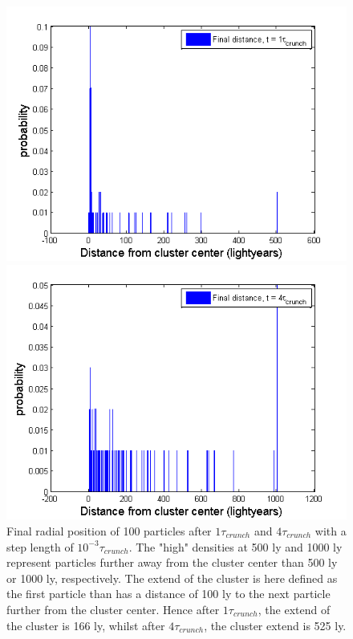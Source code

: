 \begin{figure}[H]
\centering
\begin{minipage}{.5\textwidth}
  \centering
  \includegraphics[width=1\linewidth]{Figures/stability/RK4_stability_1t.png}
\end{minipage}%
\begin{minipage}{.5\textwidth}
  \centering
  \includegraphics[width=1\linewidth]{Figures/stability/RK4_stability_4t_2_zoom.png}
\end{minipage}
\caption{
Final radial position of 100 particles after $1\tau_{crunch}$ and $4\tau_{crunch}$ with a step length of $10^{-3} \tau_{crunch}$.
The "high" densities at 500 ly and 1000 ly represent particles further away from the cluster center than 500 ly or 1000 ly, respectively.
The extend of the cluster is here defined as the first particle than has a distance of 100 ly to the next particle further from the cluster center. 
Hence after $1\tau_{crunch}$, the extend of the cluster is 166 ly, whilst after $4\tau_{crunch}$, the cluster extend is 525 ly.
}
\label{fig:StabilityEquilibriumHistogram}
\end{figure}
